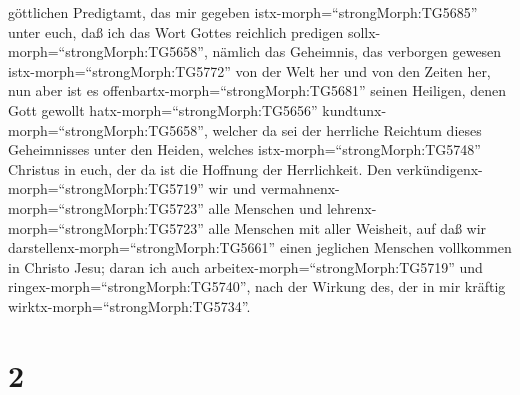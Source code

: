 göttlichen Predigtamt, das mir gegeben istx-morph=``strongMorph:TG5685''
unter euch, daß ich das Wort Gottes reichlich predigen
sollx-morph=``strongMorph:TG5658'',  nämlich das Geheimnis,
das verborgen gewesen istx-morph=``strongMorph:TG5772'' von der Welt her
und von den Zeiten her, nun aber ist es
offenbartx-morph=``strongMorph:TG5681'' seinen Heiligen, 
denen Gott gewollt hatx-morph=``strongMorph:TG5656''
kundtunx-morph=``strongMorph:TG5658'', welcher da sei der herrliche
Reichtum dieses Geheimnisses unter den Heiden, welches
istx-morph=``strongMorph:TG5748'' Christus in euch, der da ist die
Hoffnung der Herrlichkeit.  Den
verkündigenx-morph=``strongMorph:TG5719'' wir und
vermahnenx-morph=``strongMorph:TG5723'' alle Menschen und
lehrenx-morph=``strongMorph:TG5723'' alle Menschen mit aller Weisheit,
auf daß wir darstellenx-morph=``strongMorph:TG5661'' einen jeglichen
Menschen vollkommen in Christo Jesu;  daran ich auch
arbeitex-morph=``strongMorph:TG5719'' und
ringex-morph=``strongMorph:TG5740'', nach der Wirkung des, der in mir
kräftig wirktx-morph=``strongMorph:TG5734''.

\hypertarget{section-1}{%
\section{2}\label{section-1}}

